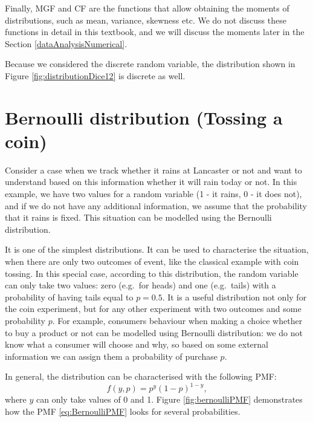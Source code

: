 \documentclass[
]{book}
\theoremstyle{definition}
\theoremstyle{definition}
\theoremstyle{definition}
\theoremstyle{definition}
\theoremstyle{remark}
\begin{document}
Finally, MGF and CF are the functions that allow obtaining the moments of distributions, such as mean, variance, skewness etc. We do not discuss these functions in detail in this textbook, and we will discuss the moments later in the Section \ref{dataAnalysisNumerical}.

Because we considered the discrete random variable, the distribution shown in Figure \ref{fig:distributionDice12} is discrete as well.

\section{Bernoulli distribution (Tossing a coin)}\label{distributionBernoulli}

Consider a case when we track whether it rains at Lancaster or not and want to understand based on this information whether it will rain today or not. In this example, we have two values for a random variable (1 - it rains, 0 - it does not), and if we do not have any additional information, we assume that the probability that it rains is fixed. This situation can be modelled using the Bernoulli distribution.

It is one of the simplest distributions. It can be used to characterise the situation, when there are only two outcomes of event, like the classical example with coin tossing. In this special case, according to this distribution, the random variable can only take two values: zero (e.g.~for heads) and one (e.g.~tails) with a probability of having tails equal to \(p=0.5\). It is a useful distribution not only for the coin experiment, but for any other experiment with two outcomes and some probability \(p\). For example, consumers behaviour when making a choice whether to buy a product or not can be modelled using Bernoulli distribution: we do not know what a consumer will choose and why, so based on some external information we can assign them a probability of purchase \(p\).

In general, the distribution can be characterised with the following PMF:
\begin{equation}
    f(y, p) = p^y (1-p)^{1-y},
    \label{eq:BernoulliPMF}
\end{equation}
where \(y\) can only take values of 0 and 1. Figure \ref{fig:bernoulliPMF} demonstrates how the PMF \eqref{eq:BernoulliPMF} looks for several probabilities.
\end{document}
